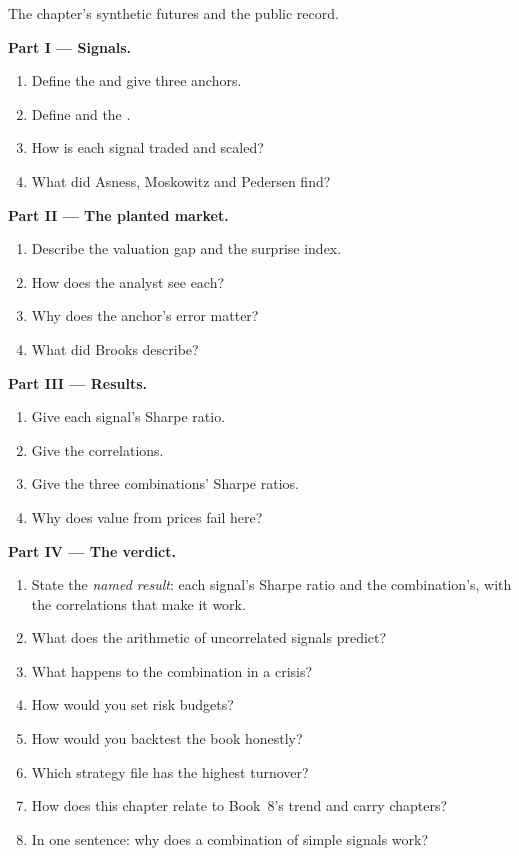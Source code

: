 \begin{problem}\label{pb:s2:systematic-macro:1}
The chapter's synthetic futures and the public record.

\medskip\noindent\textbf{Part I --- Signals.}
\begin{enumerate}
\item Define the  and give three anchors.
\item Define  and the .
\item How is each signal traded and scaled?
\item What did Asness, Moskowitz and Pedersen find?
\end{enumerate}

\medskip\noindent\textbf{Part II --- The planted market.}
\begin{enumerate}[resume]
\item Describe the valuation gap and the surprise index.
\item How does the analyst see each?
\item Why does the anchor's error matter?
\item What did Brooks describe?
\end{enumerate}

\medskip\noindent\textbf{Part III --- Results.}
\begin{enumerate}[resume]
\item Give each signal's Sharpe ratio.
\item Give the correlations.
\item Give the three combinations' Sharpe ratios.
\item Why does value from prices fail here?
\end{enumerate}

\medskip\noindent\textbf{Part IV --- The verdict.}
\begin{enumerate}[resume]
\item State the \emph{named result}: each signal's Sharpe ratio and the combination's, with the correlations that make it work.
\item What does the arithmetic of uncorrelated signals predict?
\item What happens to the combination in a crisis?
\item How would you set risk budgets?
\item How would you backtest the book honestly?
\item Which strategy file has the highest turnover?
\item How does this chapter relate to Book~8's trend and carry chapters?
\item In one sentence: why does a combination of simple signals work?
\end{enumerate}
\end{problem}


